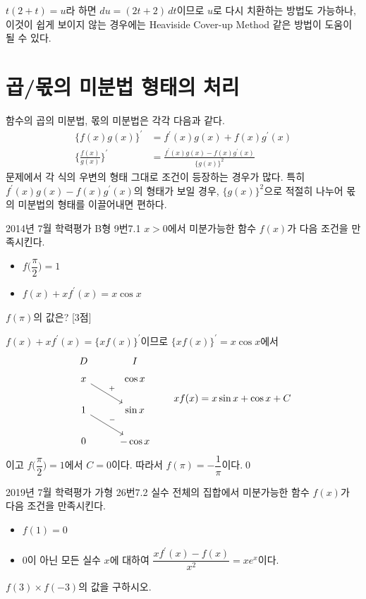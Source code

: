 \documentclass{article}
\begin{document}
\begin{remark}
	$t(2+t)=u$라 하면 $du=(2t+2)\,dt$이므로 $u$로 다시 치환하는 방법도 가능하나, 이것이 쉽게 보이지 않는 경우에는 Heaviside Cover-up Method 같은 방법이 도움이 될 수 있다.
\end{remark}

\section{곱/몫의 미분법 형태의 처리}
함수의 곱의 미분법, 몫의 미분법은 각각 다음과 같다.
\begin{align*}
	\{f(x)g(x)\}^{\prime}&=f^{\prime}(x)g(x)+f(x)g^{\prime}(x)\\
	\biggl\{\frac{f(x)}{g(x)}\biggr\}^{\prime}&=\frac{f^{\prime}(x)g(x)-f(x)g^{\prime}(x)}{\{g(x)\}^2}
\end{align*}
문제에서 각 식의 우변의 형태 그대로 조건이 등장하는 경우가 많다. 특히  $f^{\prime}(x)g(x)-f(x)g^{\prime}(x)$의 형태가 보일 경우, $\{g(x)\}^2$으로 적절히 나누어 몫의 미분법의 형태를 이끌어내면 편하다.

\newpage
\begin{exc}{2014년 7월 학력평가 B형 9번}{7.1}
	$x>0$에서 미분가능한 함수 $f(x)$가 다음 조건을 만족시킨다.
	\begin{hint}
		\begin{itemize}
			\item[(가)] $f\biggl(\dfrac{\pi}{2}\biggr)=1$
			\item[(나)] $f(x)+xf^{\prime}(x)=x\cos x$
		\end{itemize}
	\end{hint}
	$f(\pi)$의 값은? [3점]
\end{exc}

\begin{sol}
	$f(x)+xf^{\prime}(x)=\{xf(x)\}^{\prime}$이므로 $\{xf(x)\}^{\prime}=x\cos x$에서
	\[
		\begin{tikzcd}
			D & I \\[-12pt]
			x \arrow[rd, "+"] & \cos x \\
			1 \arrow[rd, "-"] & \sin x \\
			0 & -\cos x
		\end{tikzcd}\qquad xf(x)=x\sin x+\cos x+C
	\]
	이고 $f\biggl(\dfrac{\pi}{2}\biggr)=1$에서 $C=0$이다. 따라서 $f(\pi)=-\dfrac{1}{\pi}$이다.\qed
\end{sol}

\begin{exc}{2019년 7월 학력평가 가형 26번}{7.2}
	실수 전체의 집합에서 미분가능한 함수 $f(x)$가 다음 조건을 만족시킨다.
	\begin{hint}
		\begin{itemize}
			\item[(가)] $f(1)=0$
			\item[(나)] $0$이 아닌 모든 실수 $x$에 대하여 $\dfrac{xf^{\prime}(x)-f(x)}{x^2}=xe^x$이다.
		\end{itemize}
	\end{hint}
	$f(3)\times f(-3)$의 값을 구하시오.
\end{exc}
\end{document}
